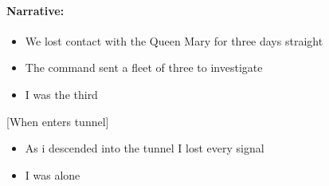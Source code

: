 \documentclass{article}
\begin{document}
\paragraph{Narrative: } 
\begin{itemize}
\item We lost contact with the Queen Mary for three days straight
\item The command sent a fleet of three to investigate
\item I was the third
\end{itemize}
[When enters tunnel]
\begin{itemize}
\item As i descended into the tunnel I lost every signal
\item I was alone
\end{itemize}
\end{document}
